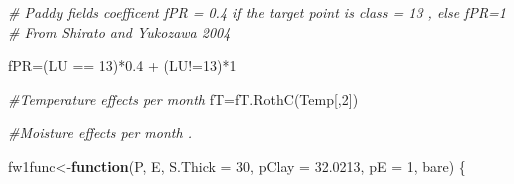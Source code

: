 \documentclass[
  10pt,
  b5paper,
]{book}
\newenvironment{Shaded}{\begin{snugshade}}{\end{snugshade}}
\newcommand{\AttributeTok}[1]{\textcolor[rgb]{0.77,0.63,0.00}{#1}}
\newcommand{\CommentTok}[1]{\textcolor[rgb]{0.56,0.35,0.01}{\textit{#1}}}
\newcommand{\ControlFlowTok}[1]{\textcolor[rgb]{0.13,0.29,0.53}{\textbf{#1}}}
\newcommand{\DecValTok}[1]{\textcolor[rgb]{0.00,0.00,0.81}{#1}}
\newcommand{\FloatTok}[1]{\textcolor[rgb]{0.00,0.00,0.81}{#1}}
\newcommand{\FunctionTok}[1]{\textcolor[rgb]{0.00,0.00,0.00}{#1}}
\newcommand{\NormalTok}[1]{#1}
\newcommand{\OtherTok}[1]{\textcolor[rgb]{0.56,0.35,0.01}{#1}}
\newcommand{\SpecialCharTok}[1]{\textcolor[rgb]{0.00,0.00,0.00}{#1}}
\begin{document}
\begin{Shaded}
\begin{Highlighting}[]
 \CommentTok{\# Paddy fields coefficent fPR = 0.4 if the target point is class = 13 , else fPR=1}
  \CommentTok{\# From Shirato and Yukozawa 2004}
  
  
\NormalTok{  fPR}\OtherTok{=}\NormalTok{(LU }\SpecialCharTok{==} \DecValTok{13}\NormalTok{)}\SpecialCharTok{*}\FloatTok{0.4} \SpecialCharTok{+}\NormalTok{ (LU}\SpecialCharTok{!=}\DecValTok{13}\NormalTok{)}\SpecialCharTok{*}\DecValTok{1}
  
  \CommentTok{\#Temperature effects per month}
\NormalTok{  fT}\OtherTok{=}\FunctionTok{fT.RothC}\NormalTok{(Temp[,}\DecValTok{2}\NormalTok{]) }
  
  \CommentTok{\#Moisture effects per month . }
  
\NormalTok{  fw1func}\OtherTok{\textless{}{-}}\ControlFlowTok{function}\NormalTok{(P, E, }\AttributeTok{S.Thick =} \DecValTok{30}\NormalTok{, }\AttributeTok{pClay =} \FloatTok{32.0213}\NormalTok{, }\AttributeTok{pE =} \DecValTok{1}\NormalTok{, bare) }
\NormalTok{  \{}
    

\end{Highlighting}
\end{Shaded}
\end{document}
